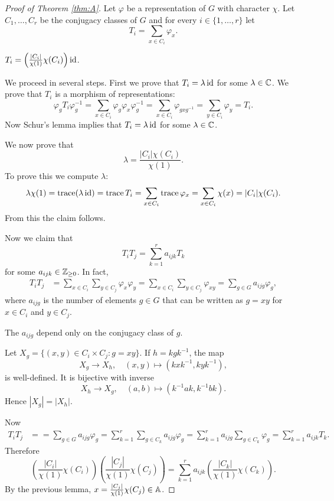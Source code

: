 \begin{proof}[Proof of Theorem \ref{thm:A}]
    Let $\varphi$ be a representation of $G$ with character $\chi$. 
    Let $C_1,\dots,C_r$ be the conjugacy classes of $G$ 
    and for every $i\in\{1,\dots,r\}$ let 
    \[
    T_i=\sum_{x\in C_i}\varphi_x. 
    \]
    
    \begin{claim}
        $T_i=\left(\frac{|C_i|}{\chi(1)}\chi(C_i)\right)\operatorname{id}$. 
    \end{claim}
    
    We proceed in several steps. First we prove that 
    $T_i=\lambda\operatorname{id}$ for some $\lambda\in\mathbb{C}$. 
    We prove that $T_i$ is a morphism of representations:
    \[
    \varphi_gT_i\varphi_g^{-1}=\sum_{x\in C_i}\varphi_g\varphi_x\varphi_g^{-1}
    =\sum_{x\in C_i}\varphi_{gxg^{-1}}=\sum_{y\in C_i}\varphi_y=T_i.
    \]
    Now Schur's lemma implies that $T_i=\lambda\operatorname{id}$ for some
    $\lambda\in\mathbb{C}$. 
    
    We now prove that 
    \[
    \lambda=\frac{|C_i|\chi(C_i)}{\chi(1)}.
    \]
    To prove
    this we compute $\lambda$:
    \[
    \lambda\chi(1)=\operatorname{trace}(\lambda\operatorname{id})
    =\operatorname{trace} T_i
    =\sum_{x\in C_i}\operatorname{trace}\varphi_x
    =\sum_{x\in C_i}\chi(x)
    =|C_i|\chi(C_i).
    \]
    From this the claim follows. 
    
    Now we claim that 
    \[
    T_iT_j=\sum_{k=1}^r a_{ijk}T_k
    \]
    for some $a_{ijk}\in\mathbb{Z}_{\geq0}$. In fact, 
    \begin{align*}
        T_iT_j &= \sum_{x\in C_i}\sum_{y\in C_j}\varphi_x\varphi_y
        =\sum_{x\in C_i}\sum_{y\in C_j}\varphi_{xy}
        =\sum_{g\in G}a_{ijg}\varphi_g,
    \end{align*}
    where $a_{ijg}$ is the number of elements $g\in G$ 
    that can be written 
    as $g=xy$ for $x\in C_i$ and $y\in C_j$. 
    
    \begin{claim}
        The $a_{ijg}$ depend only on the conjugacy class of $g$.
    \end{claim}
    
    Let $X_g=\{(x,y)\in C_i\times C_j:g=xy\}$. If $h=kgk^{-1}$, the map
    \[
    X_g\to X_h,\quad (x,y)\mapsto (kxk^{-1},kyk^{-1}),
    \]
    is well-defined. It is bijective with inverse
    \[
    X_h\to X_g,\quad
    (a,b)\mapsto (k^{-1}ak,k^{-1}bk).
    \]
    Hence $|X_g|=|X_h|$. 
    
    Now 
    \begin{align*}
        T_iT_j &= 
        =\sum_{g\in G}a_{ijg}\varphi_g
        =\sum_{k=1}^r\sum_{g\in C_k}a_{ijg}\varphi_g
        =\sum_{k=1}^ra_{ijg}\sum_{g\in C_k}\varphi_g
        =\sum_{k=1}^ra_{ijk}T_k.
    \end{align*}
    Therefore 
    \begin{equation}
        \label{eq:omega}
    \left(\frac{|C_i|}{\chi(1)}\chi(C_i)\right)
    \left(\frac{|C_j|}{\chi(1)}\chi(C_j)\right)
    =\sum_{k=1}^r a_{ijk}\left(\frac{|C_k|}{\chi(1)}\chi(C_k)\right).
    \end{equation}
    By the previous lemma, $x=\frac{|C_j|}{\chi(1)}\chi(C_j)\in\mathbb{A}$.
\end{proof}

